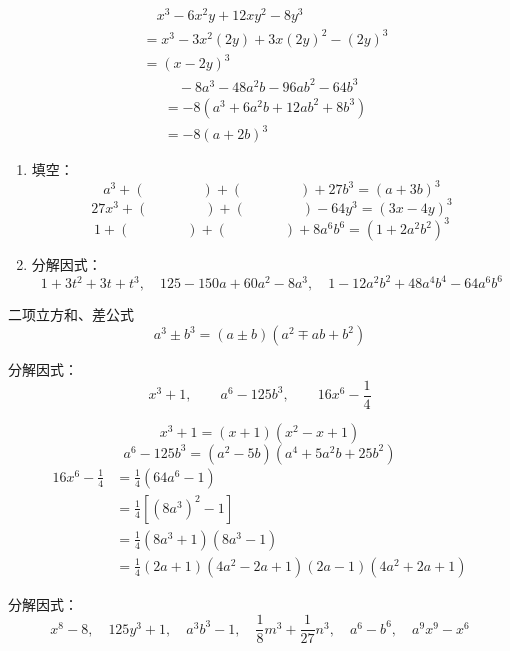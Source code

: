 \begin{solution}
\[\begin{split}
      &\quad       x^3-6x^2y+12xy^2-8y^3\\
      &=x^3-3x^2(2y)+3x(2y)^2-(2y)^3\\
      &=(x-2y)^3
        \end{split}\]
 \[\begin{split}
            &\quad -8a^3-48a^2b-96ab^2-64b^3\\
&=-8(a^3+6a^2b+12ab^2+8b^3)\\
&=-8(a+2b)^3
        \end{split}\]
  
\end{solution}

\begin{ex}
\begin{enumerate}
    \item 填空：
    \[a^3+(\qquad \qquad)+(\qquad\qquad )+27b^3=(a+3b)^3\]
    \[27x^3+(\qquad\qquad)+(\qquad\qquad )-64y^3=(3x-4y)^3\]
    \[1+(\qquad\qquad)+(\qquad\qquad)+8a^6b^6=(1+2a^2b^2)^3\]

\item 分解因式：
\[1+3t^2+3t+t^3,\quad 125-150a+60a^2-8a^3,\quad 1-12a^2b^2+48a^4b^4-64a^6b^6\]
\end{enumerate}    
\end{ex}

\begin{blk}{二项立方和、差公式}
    \[a^3\pm b^3 =(a\pm b)(a^2\mp ab+b^2)\]
\end{blk}

\begin{example}
分解因式：
\[x^3+1,\qquad a^6-125b^3,\qquad 16x^6-\frac{1}{4}\]
\end{example}

\begin{solution}
\[x^3+1=(x+1)(x^2-x+1)\]
\[a^6-125b^3=(a^2-5b)(a^4+5a^2b+25b^2)\]
\[\begin{split}
    16x^6-\frac{1}{4}&=\frac{1}{4}(64a^6-1)\\
    &=\frac{1}{4}\left[(8a^3)^2-1\right]\\
    &=\frac{1}{4}(8a^3+1)(8a^3-1)\\
    &=\frac{1}{4}(2a+1)(4a^2-2a+1)(2a-1)(4a^2+2a+1)
\end{split}\]
\end{solution}

\begin{ex}
    分解因式：
\[x^8-8,\quad 125y^3+1,\quad  a^3b^3-1,\quad \frac{1}{8}m^3+\frac{1}{27}n^3,\quad a^6-b^6,\quad a^9x^9-x^6\]
\end{ex}

